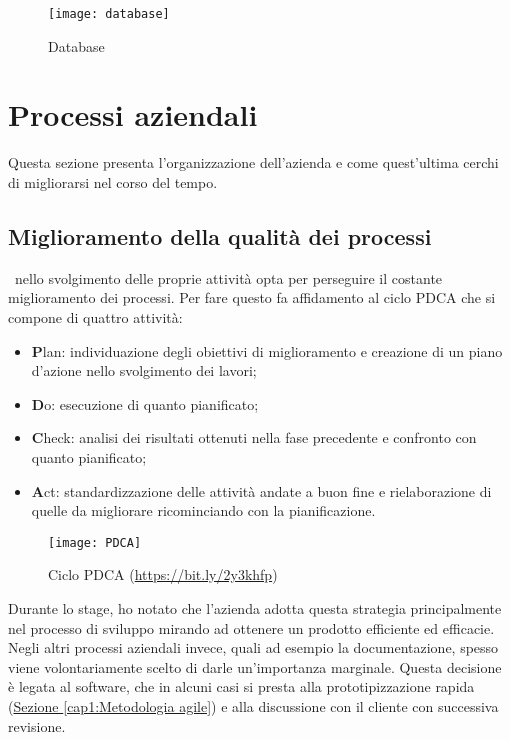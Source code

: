 \begin{figure}[!h] 
	\centering 
	\texttt{[image: database]} 
	\caption{Database}
\end{figure}


\section{Processi aziendali}
\label{cap1:Processi aziendali}

Questa sezione presenta l'organizzazione dell'azienda e come quest'ultima cerchi di migliorarsi nel corso del tempo. 

\subsection{Miglioramento della qualità dei processi}
\label{cap1:Miglioramento della qualità dei processi}

\azienda\ nello svolgimento delle proprie attività opta per perseguire il costante miglioramento dei processi. Per fare questo fa affidamento al ciclo PDCA che si compone di quattro attività:
\begin{itemize}
	\item \textbf{P}lan: individuazione degli obiettivi di miglioramento e creazione di un piano d'azione nello svolgimento dei lavori;
	\item \textbf{D}o: esecuzione di quanto pianificato;
	\item \textbf{C}heck: analisi dei risultati ottenuti nella fase precedente e confronto con quanto pianificato; 
	\item \textbf{A}ct: standardizzazione delle attività andate a buon fine e rielaborazione di quelle da migliorare ricominciando con la pianificazione.
\end{itemize}

\begin{figure}[!h] 
	\centering 
	\texttt{[image: PDCA]} 
	\caption{Ciclo PDCA (\url{https://bit.ly/2y3khfp})}
\end{figure}

Durante lo stage, ho notato che l'azienda adotta questa strategia principalmente nel processo di sviluppo mirando ad ottenere un prodotto efficiente ed efficacie. Negli altri processi aziendali invece, quali ad esempio la documentazione, spesso viene volontariamente scelto di darle un'importanza marginale. Questa decisione è legata al software, che in alcuni casi si presta alla prototipizzazione rapida (\hyperref[cap1:Metodologia agile]{Sezione \ref{cap1:Metodologia agile}}) e alla discussione con il cliente con successiva revisione. 
 

